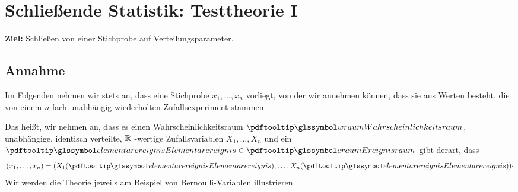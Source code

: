 



\chapter{Schließende Statistik: Testtheorie I}\label{ch:schlieende-statistik:-testtheorie-i}

\noindent \textbf{Ziel:} Schließen von einer Stichprobe auf Verteilungsparameter.


\section*{Annahme}
Im Folgenden nehmen wir stets an, dass eine Stichprobe $x_1,\dots,x_n$ vorliegt, von der wir annehmen können, dass
sie aus Werten besteht, die von einem $n$-fach unabhängig wiederholten Zufallsexperiment stammen.

Das heißt, wir nehmen an, dass es einen Wahrscheinlichkeitsraum $\wraum$, unabhängige, identisch verteilte, $\mathbb{R}$
-wertige Zufallsvariablen $X_1,\dots,X_n$ und ein $\ele\in\eraum$ gibt derart, dass
\[
    (x_1,\dots,x_n) = (X_1(\ele),\dots,X_n(\ele)) \cdot
\]
Wir werden die Theorie jeweils am Beispiel von \gls{Bernoulli-Variable}n illustrieren.

